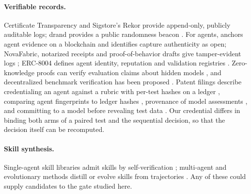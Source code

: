 \paragraph{Verifiable records.} Certificate Transparency \citep{laurie2013ct,laurie2021ctv2} and Sigstore's Rekor \citep{newman2022sigstore,sigstore2026rekor} provide append-only, publicly auditable logs; drand provides a public randomness beacon \citep{drand2026beacon}. For agents, \citet{bromme2026blackbox} anchors agent evidence on a blockchain and identifies capture authenticity as open; NovaFabric, notarized receipts and proof-of-behavior drafts give tamper-evident logs \citep{seyedkazemi2026novafabric,figuera2026notarized,dembowski2026agentledger}; ERC-8004 defines agent identity, reputation and validation registries \citep{derossi2025erc8004}. Zero-knowledge proofs can verify evaluation claims about hidden models \citep{south2024zksnarks}, and decentralized benchmark verification has been proposed \citep{pardasani2026whoverifies}. Patent filings describe credentialing an agent against a rubric with per-test hashes on a ledger \citep{drivehealth2026credentialing,drivehealth2026targeted}, comparing agent fingerprints to ledger hashes \citep{mysore2026citibank}, provenance of model assessments \citep{chen2023credo}, and committing to a model before revealing test data \citep{dayama2022ibm}. Our credential differs in binding both arms of a paired test and the sequential decision, so that the decision itself can be recomputed.

\paragraph{Skill synthesis.} Single-agent skill libraries admit skills by self-verification \citep{wang2023voyager,zhao2024expel,shinn2023reflexion,zheng2025skillweaver}; multi-agent and evolutionary methods distill or evolve skills from trajectories \citep{ni2026trace2skill,du2026multievoskill,li2026mindskill,ma2026skillv,ma2026skillneo,liu2026skillvine,hu2026selm,liu2026rethinking}. Any of these could supply candidates to the gate studied here.
